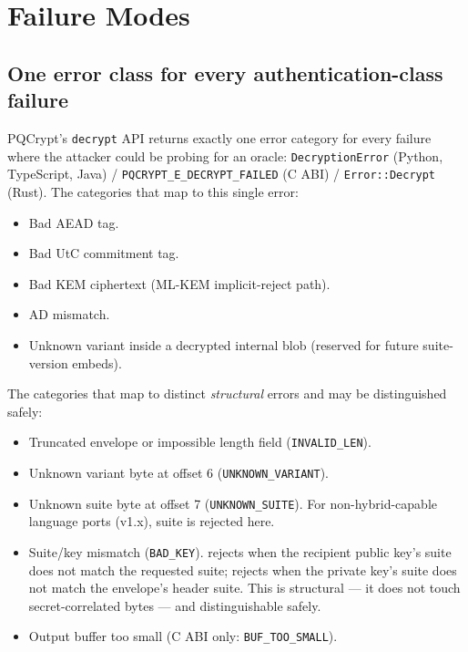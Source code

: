\section{Failure Modes}
\label{sec:failure-modes}

\subsection{One error class for every authentication-class failure}

PQCrypt's \texttt{decrypt} API returns exactly one error category for every failure where the attacker could be probing for an oracle: \texttt{DecryptionError} (Python, TypeScript, Java) / \texttt{PQCRYPT\_E\_DECRYPT\_FAILED} (C ABI) / \texttt{Error::Decrypt} (Rust). The categories that map to this single error:

\begin{itemize}
\item Bad AEAD tag.
\item Bad UtC commitment tag.
\item Bad KEM ciphertext (ML-KEM implicit-reject path).
\item AD mismatch.
\item Unknown variant inside a decrypted internal blob (reserved for future suite-version embeds).
\end{itemize}

The categories that map to distinct \emph{structural} errors and may be distinguished safely:

\begin{itemize}
\item Truncated envelope or impossible length field (\texttt{INVALID\_LEN}).
\item Unknown variant byte at offset 6 (\texttt{UNKNOWN\_VARIANT}).
\item Unknown suite byte at offset 7 (\texttt{UNKNOWN\_SUITE}). For non-hybrid-capable language ports (v1.x), suite  is rejected here.
\item Suite/key mismatch (\texttt{BAD\_KEY}).  rejects when the recipient public key's suite does not match the requested suite;  rejects when the private key's suite does not match the envelope's header suite. This is structural --- it does not touch secret-correlated bytes --- and distinguishable safely.
\item Output buffer too small (C ABI only: \texttt{BUF\_TOO\_SMALL}).
\end{itemize}

